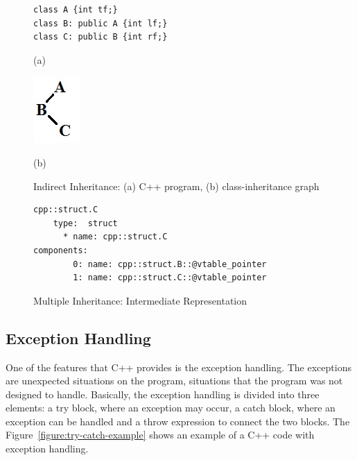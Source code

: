 \documentclass[a4paper]{llncs}
\begin{document}
\begin{figure}[h]

\begin{minipage}[b]{.48\linewidth}
\begin{lstlisting}
class A {int tf;}
class B: public A {int lf;}
class C: public B {int rf;}
\end{lstlisting}
  \centerline{(a)}\medskip
\end{minipage}
\label{figure:indirect-inheritance-code}
%
\begin{minipage}[b]{.48\linewidth}
  \centering
  \centerline{\includegraphics[scale=0.6]{figures/indirect_inheritance}}
  \centerline{(b)}\medskip
\end{minipage}
%
\caption{Indirect Inheritance: (a) C++ program, (b) class-inheritance graph}
\label{fig:indirect-inheritance-graph}
\end{figure}

\begin{figure}[h]
\centering
\begin{minipage}{0.9\textwidth}
\begin{lstlisting}[style=nonumbers]
cpp::struct.C
    type:  struct
      * name: cpp::struct.C
components:
        0: name: cpp::struct.B::@vtable_pointer
        1: name: cpp::struct.C::@vtable_pointer
\end{lstlisting}
\end{minipage}
\caption{Multiple Inheritance: Intermediate Representation}
\label{figure:indirect-inheritance-IR}
\end{figure}

\subsection{Exception Handling}

One of the features that C++ provides is the exception handling. The exceptions are unexpected situations on the program, situations
that the program was not designed to handle. Basically, the exception handling is divided into three elements: a try block, where an
exception may occur, a catch block, where an exception can be handled and a throw expression to connect the two blocks. The
Figure~\ref{figure:try-catch-example} shows an example of a C++ code with exception handling.
\end{document}
